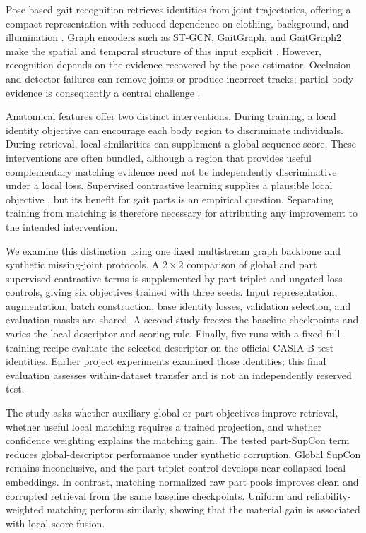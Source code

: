 \documentclass[pdflatex,iicol,sn-apa]{sn-jnl}
\begin{document}
Pose-based gait recognition retrieves identities from joint trajectories,
offering a compact representation with reduced dependence on clothing,
background, and illumination \citep{liao2020posegait}. Graph encoders such as
ST-GCN, GaitGraph, and GaitGraph2 make the spatial and temporal structure of this
input explicit \citep{yan2018stgcn,teepe2021gaitgraph,teepe2022gaitgraph2}.
However, recognition depends on the evidence recovered by the pose estimator.
Occlusion and detector failures can remove joints or produce incorrect tracks;
partial body evidence is consequently a central challenge
\citep{li2024survey,huang2024occluded}.

Anatomical features offer two distinct interventions. During training, a local
identity objective can encourage each body region to discriminate individuals.
During retrieval, local similarities can supplement a global sequence score.
These interventions are often bundled, although a region that provides useful
complementary matching evidence need not be independently discriminative under
a local loss. Supervised contrastive learning supplies a plausible local
objective \citep{khosla2020supervised}, but its benefit for gait parts is an
empirical question. Separating training from matching is therefore necessary
for attributing any improvement to the intended intervention.

We examine this distinction using one fixed multistream graph backbone and
synthetic missing-joint protocols. A $2\times2$ comparison of global and part
supervised contrastive terms is supplemented by part-triplet and ungated-loss
controls, giving six objectives trained with three seeds. Input representation,
augmentation, batch construction, base identity losses, validation selection,
and evaluation masks are shared. A second study freezes the baseline
checkpoints and varies the local descriptor and scoring rule. Finally, five
runs with a fixed full-training recipe evaluate the selected descriptor on the
official CASIA-B test identities. Earlier project experiments examined those
identities; this final evaluation assesses within-dataset transfer and is not
an independently reserved test.

The study asks whether auxiliary global or part objectives improve retrieval,
whether useful local matching requires a trained projection, and whether
confidence weighting explains the matching gain. The tested part-SupCon term
reduces global-descriptor performance under synthetic corruption. Global
SupCon remains inconclusive, and the part-triplet control develops
near-collapsed local embeddings. In contrast, matching normalized raw part
pools improves clean and corrupted retrieval from the same baseline
checkpoints. Uniform and reliability-weighted matching perform similarly,
showing that the material gain is associated with local score fusion.
\end{document}
